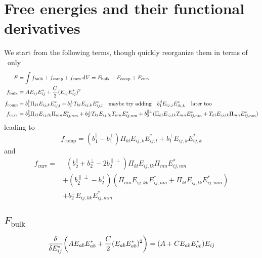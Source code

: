 \documentclass[11pt]{article}
\begin{document}
\newpage
\section{Free energies and their functional derivatives}\label{sec:freeenergies}
We start from the following terms, though quickly reorganize them in terms of \PP\ only
\begin{align}
    F &= \int f_\text{bulk} + f_\text{comp} + f_\text{curv} \dd{V} = F_\text{bulk} + F_\text{comp} + F_\text{curv}\\
    f_\text{bulk} &= A E_{ij}E_{ij}^* + \frac{C}{2} (E_{ij}E_{ij}^*)^2 \\
    f_\text{comp} &= b_1^\parallel \Pi_{kl} E_{ij,k}E_{ij,l}^* + b_1^\perp T_{kl} E_{ij,k}E_{ij,l}^* \qq{maybe try adding} b_1^d E_{ij,j}E_{ik,k}^* \qq{later too} \label{eq:fcompdef} \\
    f_\text{curv} &= b_2^\parallel \Pi_{kl}E_{ij,lk}\Pi_{mn}E_{ij,nm}^* + b_2^\perp T_{kl}E_{ij,lk}T_{mn}E_{ij,nm}^* + b_2^{\parallel\perp}(\Pi_{kl}E_{ij,lk}T_{mn}E_{ij,nm}^* + T_{kl}E_{ij,lk}\Pi_{mn}E_{ij,nm}^*)
\end{align}
leading to
\begin{equation}
    f_\text{comp} = (b_1^\parallel - b_1^\perp) \Pi_{kl} E_{ij,k}E_{ij,l}^* + b_1^\perp E_{ij,k}E_{ij,k}^*
\end{equation}
and
\begin{align}
    f_\text{curv} =&\enspace (b_2^\parallel + b_2^\perp - 2b_2^{\parallel\perp}) \Pi_{kl}E_{ij,lk}\Pi_{mn}E_{ij,nm}^* \\
    &+ (b_2^{\parallel\perp} - b_2^\perp)(\Pi_{mn}E_{ij,kk}E_{ij,nm}^* + \Pi_{kl}E_{ij,lk}E_{ij,mm}^*) \nonumber \\ 
    &+ b_2^\perp E_{ij,kk}E_{ij,mm}^* \nonumber
\end{align}

\subsection{$F_\text{bulk}$}
\begin{equation}
    \fdv{E_{ij}^*} \qty(A E_{ab}E_{ab}^* + \frac{C}{2} (E_{ab}E_{ab}^*)^2) = \qty(A + CE_{ab}E_{ab}^*)E_{ij}
\end{equation}
\end{document}
